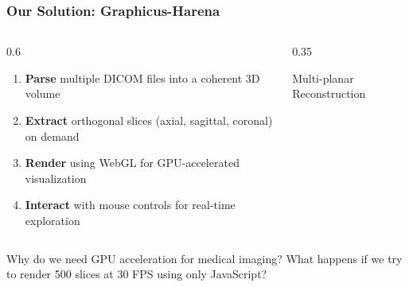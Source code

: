 \begin{frame}
\frametitle{Our Solution: Graphicus-Harena}

\begin{columns}[T]
\begin{column}{0.6\textwidth}
  \begin{enumerate}
    \item \textbf{Parse} multiple DICOM files into a coherent 3D volume
    \item \textbf{Extract} orthogonal slices (axial, sagittal, coronal) on demand
    \item \textbf{Render} using WebGL for GPU-accelerated visualization
    \item \textbf{Interact} with mouse controls for real-time exploration
  \end{enumerate}
\end{column}
\begin{column}{0.35\textwidth}
  \begin{center}
    \vspace{0.3cm}
    {\small\color{medicalgray}Multi-planar Reconstruction}
  \end{center}
\end{column}
\end{columns}

\vspace{0.5cm}
Why do we need GPU acceleration for medical imaging? What happens if we try to render 500 slices at 30 FPS using only JavaScript?
\end{frame}


